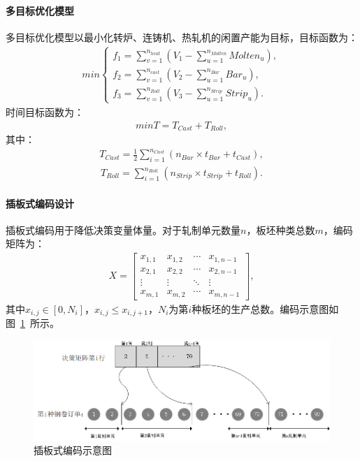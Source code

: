 \documentclass{whutmod}
\begin{document}
\paragraph{多目标优化模型}
多目标优化模型以最小化转炉、连铸机、热轧机的闲置产能为目标，目标函数为：
\begin{gather}
min \left\{\begin{matrix}f_1=\sum_{v=1}^{n_{heat}}( V_1-\sum_{u=1}^{n_{Molten}} Molten_u),
\\ f_2=\sum_{v=1}^{n_{cast}}( V_2-\sum_{u=1}^{n_{Bar}} Bar_u),
\\ f_3=\sum_{v=1}^{n_{Roll}}( V_3-\sum_{u=1}^{n_{Strip}} Strip_u).
\end{matrix}\right.
\end{gather}
时间目标函数为：
\begin{gather}
minT=T_{Cast}+T_{Roll},
\end{gather}
其中：
\begin{gather*}
T_{Cast}=\frac{1}{2}\sum_{i=1}^{n_{Cast}}(n_{Bar}\times t_{Bar}+t_{Cast}),
\end{gather*}
\begin{gather*}
T_{Roll}=\sum_{i=1}^{n_{Roll}}(n_{Strip}\times t_{Strip}+t_{Roll}).
\end{gather*}

\paragraph{插板式编码设计}
插板式编码用于降低决策变量体量。对于轧制单元数量$n$，板坯种类总数$m$，编码矩阵为：
\begin{gather*}
X= \begin{bmatrix}
x_{1,1} & x_{1,2} &\cdots   & x_{1,n-1}\\ 
x_{2,1} & x_{2,2} &\cdots   & x_{2,n-1}\\ 
\vdots  & \vdots  & \ddots  & \vdots \\ 
x_{m,1} & x_{m,2} &\cdots   & x_{m,n-1}
\end{bmatrix},
\end{gather*}
其中$x_{i,j}\in[0,N_i]$，$x_{i,j}\leqslant x_{i,j+1}$，$N_i$为第$i$种板坯的生产总数。编码示意图如图~\ref{lssssabel}~所示。
\begin{figure}[H]
\centering
\includegraphics[width=\textwidth]{figures/bianma.png}
\caption{插板式编码示意图}\label{lssssabel}
\end{figure}
\end{document}
